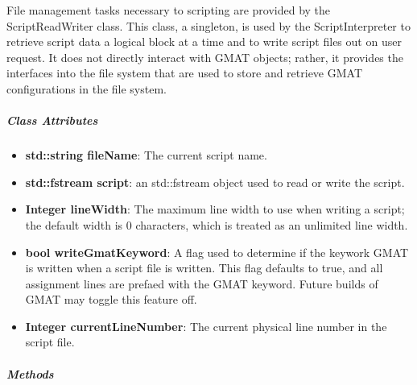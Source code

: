 File management tasks necessary to scripting are provided by the ScriptReadWriter class.  This
class, a singleton, is used by the ScriptInterpreter to retrieve script data a logical block at a
time and to write script files out on user request.  It does not directly interact with GMAT
objects; rather, it provides the interfaces into the file system that are used to store and retrieve
GMAT configurations in the file system.

\subparagraph{\textit{Class Attributes}}

\begin{itemize}
\item \textbf{std::string fileName}:  The current script name.
\item \textbf{std::fstream script}:  an std::fstream object used to read or write the script.
\item \textbf{Integer lineWidth}:  The maximum line width to use when writing a script; the
default width is 0 characters, which is treated as an unlimited line width.
\item \textbf{bool writeGmatKeyword}: A flag used to determine if the keywork GMAT is written when
a script file is written.  This flag defaults to true, and all assignment lines are prefaed with
the GMAT keyword.  Future builds of GMAT may toggle this feature off.
\item \textbf{Integer currentLineNumber}:  The current physical line number in the script file.
\end{itemize}

\subparagraph{\textit{Methods}}

